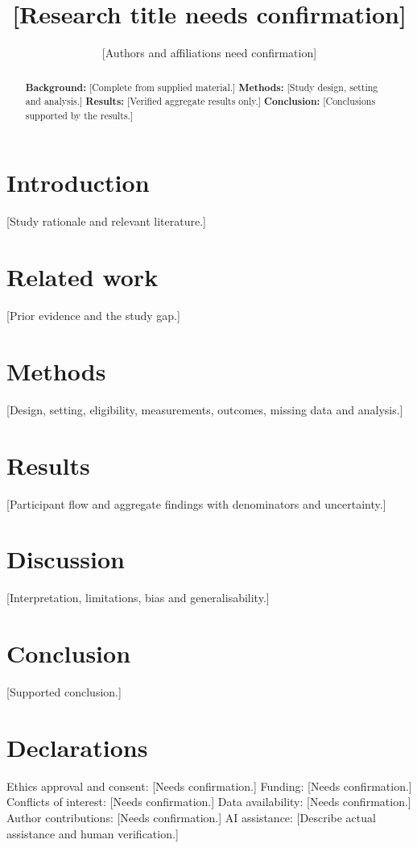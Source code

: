 \documentclass[11pt,a4paper]{article}
\title{[Research title needs confirmation]}
\author{[Authors and affiliations need confirmation]}
\date{}
\begin{document}
\maketitle
\begin{abstract}
\textbf{Background:} [Complete from supplied material.]
\textbf{Methods:} [Study design, setting and analysis.]
\textbf{Results:} [Verified aggregate results only.]
\textbf{Conclusion:} [Conclusions supported by the results.]
\end{abstract}
\section{Introduction}
[Study rationale and relevant literature.]
\section{Related work}
[Prior evidence and the study gap.]
\section{Methods}
[Design, setting, eligibility, measurements, outcomes, missing data and analysis.]
\section{Results}
[Participant flow and aggregate findings with denominators and uncertainty.]
\section{Discussion}
[Interpretation, limitations, bias and generalisability.]
\section{Conclusion}
[Supported conclusion.]
\section*{Declarations}
Ethics approval and consent: [Needs confirmation.]
Funding: [Needs confirmation.]
Conflicts of interest: [Needs confirmation.]
Data availability: [Needs confirmation.]
Author contributions: [Needs confirmation.]
AI assistance: [Describe actual assistance and human verification.]


\end{document}
